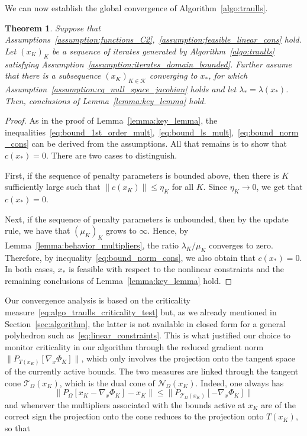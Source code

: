 \documentclass{article}
\numberwithin{equation}{section}
\newcommand{\calK}{{\mathcal{K}}}
\newcommand{\calN}{{\mathcal{N}}}
\newcommand{\calT}{{\mathcal{T}}}
\newcommand{\proj}[2]{P_{#1} \left[ {#2} \right]} %
\theoremstyle{plain}
\newtheorem{theorem}{Theorem}
\begin{document}
	We can now establish the global convergence of Algorithm~\ref{algo:traulls}.
	\begin{theorem}\label{theo:global_convergence_traulls}
		Suppose that Assumptions~\ref{assumption:functions_C2},~\ref{assumption:feasible_linear_cons} hold. Let $\left(x_K\right)_{K}$ be a sequence of iterates generated by Algorithm~\ref{algo:traulls} satisfying Assumption~\ref{assumption:iterates_domain_bounded}. Further assume that there is a subsequence $(x_K)_{K \in \calK}$ converging to $x_*$, for which Assumption~\ref{assumption:cq_null_space_jacobian} holds and let $\lambda_* = \lambda(x_*)$.
		Then, conclusions of Lemma~\ref{lemma:key_lemma} hold.
	\end{theorem}
	\begin{proof}
		As in the proof of Lemma~\ref{lemma:key_lemma}, the inequalities~\eqref{eq:bound_1st_order_mult},~\eqref{eq:bound_ls_mult},~\eqref{eq:bound_norm_cons} can be derived from the assumptions. All that remains is to show that $c(x_*) = 0$. There are two cases to distinguish. 
		
		First, if the sequence of penalty parameters is bounded above, then there is $K$ sufficiently large such that $\|c(x_K)\| \le \eta_K$ for all $K$. Since $\eta_K \to 0$, we get that $c(x_*) = 0$.
		
		Next, if the sequence of penalty parameters is unbounded, then by the update rule, we have that $(\mu_K)_K$ grows to $\infty$. Hence, by Lemma~\ref{lemma:behavior_multipliers}, the ratio $\lambda_K /\mu_K$ converges to zero. Therefore, by inequality~\eqref{eq:bound_norm_cons}, we also obtain that $c(x_*) = 0$. 
		In both cases, $x_*$ is feasible with respect to the nonlinear constraints and the remaining conclusions of Lemma~\ref{lemma:key_lemma} hold.
	\end{proof}
	Our convergence analysis is based on the criticality measure~\eqref{eq:algo_traulls_criticality_test} but, as we already mentioned in Section~\ref{sec:algorithm}, the latter is not available in closed form for a general polyhedron such as~\eqref{eq:linear_constraints}. This is what justified our choice to monitor criticality in our algorithm through the reduced gradient norm $\|P_{T(x_K)}[\nabla_x\Phi_K]\|$, which only involves the projection onto the tangent space of the currently active bounds. The two measures are linked through the tangent cone $\calT_\Omega(x_K)$, which is the dual cone of $\calN_\Omega(x_K)$. Indeed, one always has \[\|\proj{\Omega}{x_K-\nabla_x\Phi_K}-x_K\|\le\|P_{\calT_\Omega(x_K)}[-\nabla_x\Phi_K]\|\] 
	and whenever the multipliers associated with the bounds active at $x_K$ are of the correct sign the projection onto the cone reduces to the projection onto $T(x_K)$, so that~\cite[Section 7.2]{conn-etal:1996b}
\end{document}
